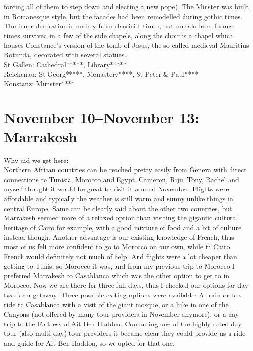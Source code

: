 forcing all of them to step down and electing a new pope). The Minster was built in Romanesque style, but the facades had been remodelled during gothic times. The inner decoration is mainly from classicist times, but murals from former times survived in a few of the side chapels, along the choir is a chapel which houses Constance's version of the tomb of Jesus, the so-called medieval Mauritius Rotunda, decorated with several statues.\\

St Gallen: Cathedral*****, Library*****\\
Reichenau: St Georg*****, Monastery****, St Peter \& Paul****\\
Konstanz: M\"unster****

\section{November 10--November 13: Marrakesh}
\label{Marrakesh2017}

Why did we get here:\\
Northern African countries can be reached pretty easily from Geneva with direct connections to Tunisia, Morocco and Egypt. Cameron, Riju, Tony, Rachel and myself thought it would be great to visit it around November. Flights were affordable and typically the weather is still warm and sunny unlike things in central Europe. Same can be clearly said about the other two countries, but Marrakesh seemed more of a relaxed option than visiting the gigantic cultural heritage of Cairo for example, with a good mixture of food and a bit of culture instead though. Another advantage is our existing knowledge of French, thus most of us felt more confident to go to Morocco on our own, while in Cairo French would definitely not much of help. And flights were a lot cheaper than getting to Tunis, so Morocco it was, and from my previous trip to Morocco I preferred Marrakesh to Casablanca which was the other option to get to in Morocco. Now we are there for three full days, thus I checked our options for day two for a getaway. Three possible exiting options were available: A train or bus ride to Casablanca with a visit of the giant mosque, or a hike in one of the Canyons (not offered by many tour providers in November anymore), or a day trip to the Fortress of Ait Ben Haddou. Contacting one of the highly rated day tour (also multi-day) tour providers it became clear they could provide us a ride and guide for Ait Ben Haddou, so we opted for that one.\\

